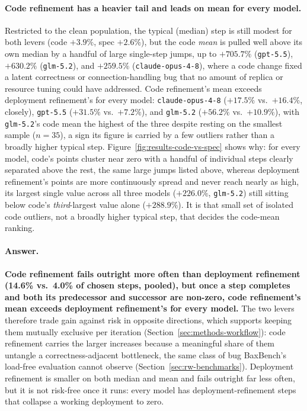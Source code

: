 \paragraph{Code refinement has a heavier tail and leads on mean for every
model.} Restricted to the clean population, the typical (median) step is
still modest for both levers (code $+3.9\%$, spec $+2.6\%$), but the code
\emph{mean} is pulled well above its own median by a handful of large
single-step jumps, up to $+705.7\%$ (\texttt{gpt-5.5}), $+630.2\%$
(\texttt{glm-5.2}), and $+259.5\%$ (\texttt{claude-opus-4-8}), where a
code change fixed a latent correctness or connection-handling bug that no
amount of replica or resource tuning could have addressed. Code
refinement's mean exceeds deployment refinement's for every model:
\texttt{claude-opus-4-8} ($+17.5\%$ vs.\ $+16.4\%$, closely),
\texttt{gpt-5.5} ($+31.5\%$ vs.\ $+7.2\%$), and \texttt{glm-5.2} ($+56.2\%$
vs.\ $+10.9\%$), with \texttt{glm-5.2}'s code mean the highest of the
three despite resting on the smallest sample ($n=35$), a sign its figure
is carried by a few outliers rather than a broadly higher typical step.
Figure~\ref{fig:results-code-vs-spec} shows why: for every model, code's
points cluster near zero with a handful of individual steps clearly
separated above the rest, the same large jumps listed above, whereas
deployment refinement's points are more continuously spread and never
reach nearly as high, its largest single value across all three models
($+226.0\%$, \texttt{glm-5.2}) still sitting below code's
\emph{third}-largest value alone ($+288.9\%$). It is that small set of
isolated code outliers, not a broadly higher typical step, that decides
the code-mean ranking.

\paragraph{Answer.}
\textbf{Code refinement fails outright more often than deployment
refinement (14.6\% vs.\ 4.0\% of chosen steps, pooled), but once a step
completes and both its predecessor and successor are non-zero, code
refinement's mean exceeds deployment refinement's for every model.} The
two levers therefore trade gain against risk in opposite directions,
which supports keeping them mutually exclusive per iteration
(Section~\ref{sec:methods-workflow}): code refinement carries the larger
increases because a meaningful share of them untangle a
correctness-adjacent bottleneck, the same class of bug BaxBench's
load-free evaluation cannot observe (Section~\ref{sec:rw-benchmarks}).
Deployment refinement is smaller on both median and mean and fails
outright far less often, but it is not risk-free once it runs: every
model has deployment-refinement steps that collapse a working deployment to zero.


